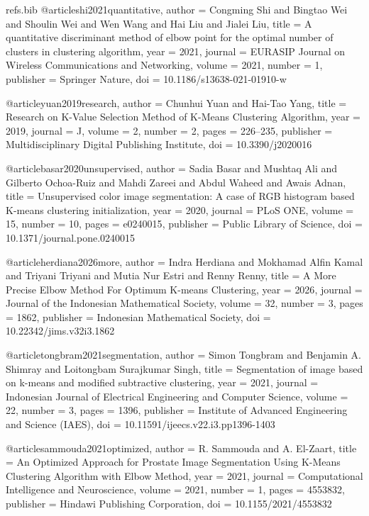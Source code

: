 \begin{filecontents*}[overwrite]{refs.bib}
@article{shi2021quantitative,
  author = {Congming Shi and Bingtao Wei and Shoulin Wei and Wen Wang and Hai Liu and Jialei Liu},
  title = {{A quantitative discriminant method of elbow point for the optimal number of clusters in clustering algorithm}},
  year = {2021},
  journal = {EURASIP Journal on Wireless Communications and Networking},
  volume = {2021},
  number = {1},
  publisher = {Springer Nature},
  doi = {10.1186/s13638-021-01910-w}
}

@article{yuan2019research,
  author = {Chunhui Yuan and Hai-Tao Yang},
  title = {{Research on K-Value Selection Method of K-Means Clustering Algorithm}},
  year = {2019},
  journal = {J},
  volume = {2},
  number = {2},
  pages = {226--235},
  publisher = {Multidisciplinary Digital Publishing Institute},
  doi = {10.3390/j2020016}
}

@article{basar2020unsupervised,
  author = {Sadia Basar and Mushtaq Ali and Gilberto Ochoa{-}Ruiz and Mahdi Zareei and Abdul Waheed and Awais Adnan},
  title = {{Unsupervised color image segmentation: A case of RGB histogram based K-means clustering initialization}},
  year = {2020},
  journal = {PLoS ONE},
  volume = {15},
  number = {10},
  pages = {e0240015},
  publisher = {Public Library of Science},
  doi = {10.1371/journal.pone.0240015}
}

@article{herdiana2026more,
  author = {Indra Herdiana and Mokhamad Alfin Kamal and Triyani Triyani and Mutia Nur Estri and Renny Renny},
  title = {{A More Precise Elbow Method For Optimum K-means Clustering}},
  year = {2026},
  journal = {Journal of the Indonesian Mathematical Society},
  volume = {32},
  number = {3},
  pages = {1862},
  publisher = {Indonesian Mathematical Society},
  doi = {10.22342/jims.v32i3.1862}
}

@article{tongbram2021segmentation,
  author = {Simon Tongbram and Benjamin A. Shimray and Loitongbam Surajkumar Singh},
  title = {{Segmentation of image based on k-means and modified subtractive clustering}},
  year = {2021},
  journal = {Indonesian Journal of Electrical Engineering and Computer Science},
  volume = {22},
  number = {3},
  pages = {1396},
  publisher = {Institute of Advanced Engineering and Science (IAES)},
  doi = {10.11591/ijeecs.v22.i3.pp1396-1403}
}

@article{sammouda2021optimized,
  author = {R. Sammouda and A. El-Zaart},
  title = {{An Optimized Approach for Prostate Image Segmentation Using K-Means Clustering Algorithm with Elbow Method}},
  year = {2021},
  journal = {Computational Intelligence and Neuroscience},
  volume = {2021},
  number = {1},
  pages = {4553832},
  publisher = {Hindawi Publishing Corporation},
  doi = {10.1155/2021/4553832}
}


\end{filecontents*}
